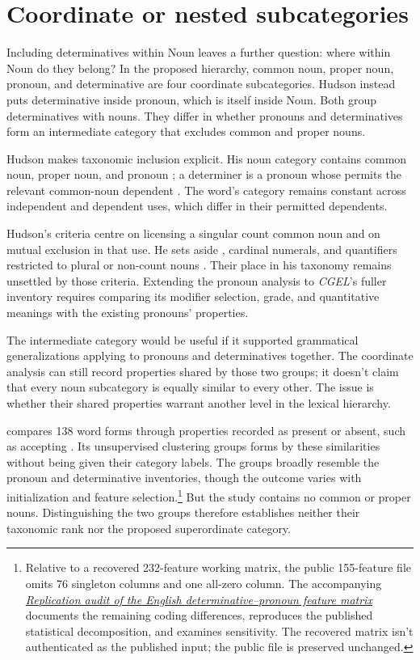 \documentclass[12pt]{article}
\begin{document}
\section{Coordinate or nested subcategories}\label{sec:inheritance}

Including determinatives within Noun leaves a further question: where within Noun do they belong? In the proposed hierarchy, common noun, proper noun, pronoun, and determinative are four coordinate subcategories. Hudson instead puts determinative inside pronoun, which is itself inside Noun. Both group determinatives with nouns. They differ in whether pronouns and determinatives form an intermediate category that excludes common and proper nouns.

Hudson makes taxonomic inclusion explicit. His noun category contains common noun, proper noun, and pronoun \citep[253--254]{hudson2010wordgrammar}; a determiner is a pronoun whose  permits the relevant common-noun dependent \citep[9--10]{hudson2004determiners}. The word's category remains constant across independent and dependent uses, which differ in their permitted dependents.

Hudson's criteria centre on licensing a singular count common noun and on mutual exclusion in that use. He sets aside , cardinal numerals, and quantifiers restricted to plural or non-count nouns \citep[9--10]{hudson2004determiners}. Their place in his taxonomy remains unsettled by those criteria. Extending the pronoun analysis to \textit{CGEL}'s fuller inventory requires comparing its modifier selection, grade, and quantitative meanings with the existing pronouns' properties.

The intermediate category would be useful if it supported grammatical generalizations applying to pronouns and determinatives together. The coordinate analysis can still record properties shared by those two groups; it doesn't claim that every noun subcategory is equally similar to every other. The issue is whether their shared properties warrant another level in the lexical hierarchy.

\textcite{reynolds2021} compares 138 word forms through properties recorded as present or absent, such as accepting . Its unsupervised clustering groups forms by these similarities without being given their category labels. The groups broadly resemble the pronoun and determinative inventories, though the outcome varies with initialization and feature selection.\footnote{Relative to a recovered 232-feature working matrix, the public 155-feature file omits 76 singleton columns and one all-zero column. The accompanying \href{run:matrix-audit.pdf}{\textit{Replication audit of the English determinative--pronoun feature matrix}} documents the remaining coding differences, reproduces the published statistical decomposition, and examines sensitivity. The recovered matrix isn't authenticated as the published input; the public file is preserved unchanged.} But the study contains no common or proper nouns. Distinguishing the two groups therefore establishes neither their taxonomic rank nor the proposed superordinate category.
\end{document}
